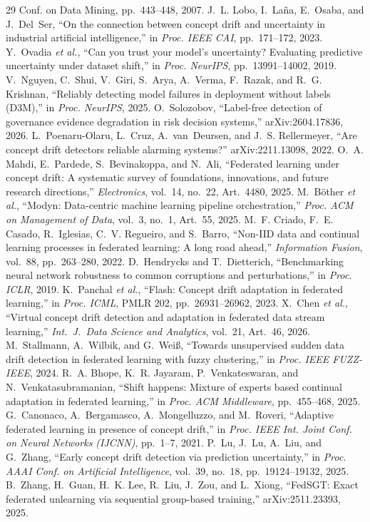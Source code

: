 \documentclass[conference]{IEEEtran}
\begin{document}
\begin{thebibliography}{29}
{Conf. on Data Mining}, pp.~443--448, 2007.
 J.~L. Lobo, I.~La{\~n}a, E.~Osaba, and J.~Del~Ser, ``On
the connection between concept drift and uncertainty in industrial
artificial intelligence,'' in \emph{Proc. IEEE CAI}, pp.~171--172, 2023.
 Y.~Ovadia \emph{et al.}, ``Can you trust your model's
uncertainty? Evaluating predictive uncertainty under dataset shift,'' in
\emph{Proc. NeurIPS}, pp.~13991--14002, 2019.
 V.~Nguyen, C.~Shui, V.~Giri, S.~Arya, A.~Verma,
F.~Razak, and R.~G. Krishnan, ``Reliably detecting model failures in
deployment without labels (D3M),'' in \emph{Proc. NeurIPS}, 2025.
 O.~Solozobov, ``Label-free detection of governance
evidence degradation in risk decision systems,'' arXiv:2604.17836, 2026.
 L.~Poenaru-Olaru, L.~Cruz, A.~van~Deursen, and
J.~S. Rellermeyer, ``Are concept drift detectors reliable alarming
systems?'' arXiv:2211.13098, 2022.
 O.~A. Mahdi, E.~Pardede, S.~Bevinakoppa, and N.~Ali,
``Federated learning under concept drift: A systematic survey of
foundations, innovations, and future research directions,''
\emph{Electronics}, vol.~14, no.~22, Art.~4480, 2025.
 M.~B{\"o}ther \emph{et al.}, ``Modyn: Data-centric
machine learning pipeline orchestration,'' \emph{Proc. ACM on Management of
Data}, vol.~3, no.~1, Art.~55, 2025.
 M.~F. Criado, F.~E. Casado, R.~Iglesias, C.~V.
Regueiro, and S.~Barro, ``Non-IID data and continual learning processes in
federated learning: A long road ahead,'' \emph{Information Fusion},
vol.~88, pp.~263--280, 2022.
 D.~Hendrycks and T.~Dietterich, ``Benchmarking
neural network robustness to common corruptions and perturbations,'' in
\emph{Proc. ICLR}, 2019.
 K.~Panchal \emph{et al.}, ``Flash: Concept drift
adaptation in federated learning,'' in \emph{Proc. ICML}, PMLR 202,
pp.~26931--26962, 2023.
 X.~Chen \emph{et al.}, ``Virtual concept drift detection
and adaptation in federated data stream learning,'' \emph{Int.\ J.\ Data
Science and Analytics}, vol.~21, Art.~46, 2026.
 M.~Stallmann, A.~Wilbik, and G.~Wei{\ss}, ``Towards
unsupervised sudden data drift detection in federated learning with fuzzy
clustering,'' in \emph{Proc. IEEE FUZZ-IEEE}, 2024.
 R.~A. Bhope, K.~R. Jayaram, P.~Venkateswaran, and
N.~Venkatasubramanian, ``Shift happens: Mixture of experts based continual
adaptation in federated learning,'' in \emph{Proc. ACM Middleware},
pp.~455--468, 2025.
 G.~Canonaco, A.~Bergamasco, A.~Mongelluzzo, and
M.~Roveri, ``Adaptive federated learning in presence of concept drift,'' in
\emph{Proc. IEEE Int. Joint Conf. on Neural Networks (IJCNN)},
pp.~1--7, 2021.
 P.~Lu, J.~Lu, A.~Liu, and G.~Zhang, ``Early concept drift
detection via prediction uncertainty,'' in \emph{Proc. AAAI Conf. on
Artificial Intelligence}, vol.~39, no.~18, pp.~19124--19132, 2025.
 B.~Zhang, H.~Guan, H.~K. Lee, R.~Liu, J.~Zou, and
L.~Xiong, ``FedSGT: Exact federated unlearning via sequential group-based
training,'' arXiv:2511.23393, 2025.
\end{thebibliography}
\end{document}
